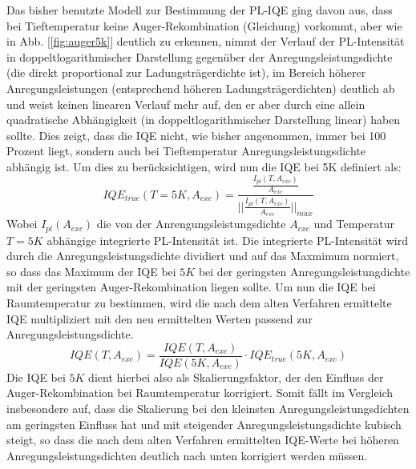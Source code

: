 \vspace{1cm}
\raggedright
Das bisher benutzte Modell zur Bestimmung der PL-IQE ging davon aus, dass bei Tieftemperatur keine Auger-Rekombination (Gleichung) vorkommt, aber wie in Abb. [\ref{fig:auger5k}] deutlich zu erkennen, nimmt der Verlauf der PL-Intensität in doppeltlogarithmischer Darstellung gegenüber der Anregungsleistungsdichte (die direkt proportional zur Ladungsträgerdichte ist), im Bereich höherer Anregungsleistungen (entsprechend höheren Ladungsträgerdichten) deutlich ab und weist keinen linearen Verlauf mehr auf, den er aber durch eine allein quadratische Abhängigkeit (in doppeltlogarithmischer Darstellung linear) haben sollte. Dies zeigt, dass die IQE nicht, wie bisher angenommen, immer bei 100 Prozent liegt, sondern auch bei Tieftemperatur Anregungsleistungsdichte abhängig ist. Um dies zu berücksichtigen, wird nun die IQE bei 5K definiert als:
%
\begin{equation}
    IQE_{true}(T = 5K, A_{exc}) = \frac{ \frac{I_{pl}(T,A_{exc}) }{A_{exc} } } { \lvert \lvert \frac{I_{pl}(T,A_{exc})}{A_{exc}} \lvert \lvert_{max} }
    \label{eq:iqetrue5k}
\end{equation}
%
Wobei $I_{pl}(A_{exc})$ die von der Anrengungsleistungsdichte $A_{exc}$ und Temperatur $T = 5K$ abhängige integrierte PL-Intensität ist. Die integrierte PL-Intensität wird durch die Anregungsleistungsdichte dividiert und auf das Maxmimum normiert, so dass das Maximum der IQE bei $5K$ bei der geringsten Anregungsleistungdichte mit der geringsten Auger-Rekombination liegen sollte. Um nun die IQE bei Raumtemperatur zu bestimmen, wird die nach dem alten Verfahren ermittelte IQE multipliziert mit den neu ermittelten Werten passend zur Anregungsleistungsdichte. 
%
\begin{equation}
    IQE(T, A_{exc}) = \frac{IQE(T,A_{exc})}{IQE(5K,A_{exc})} \cdot IQE_{true}(5K,A_{exc})
\end{equation}
%
Die IQE bei $5K$ dient hierbei also als Skalierungsfaktor, der den Einfluss der Auger-Rekombination bei Raumtemperatur korrigiert. Somit fällt im Vergleich insbesondere auf, dass die Skalierung bei den kleinsten Anregungsleistungsdichten am geringsten Einfluss hat und mit steigender Anregungsleistungsdichte kubisch steigt, so dass die nach dem alten Verfahren ermittelten IQE-Werte bei höheren Anregungsleistungsdichten deutlich nach unten korrigiert werden müssen. 
%
